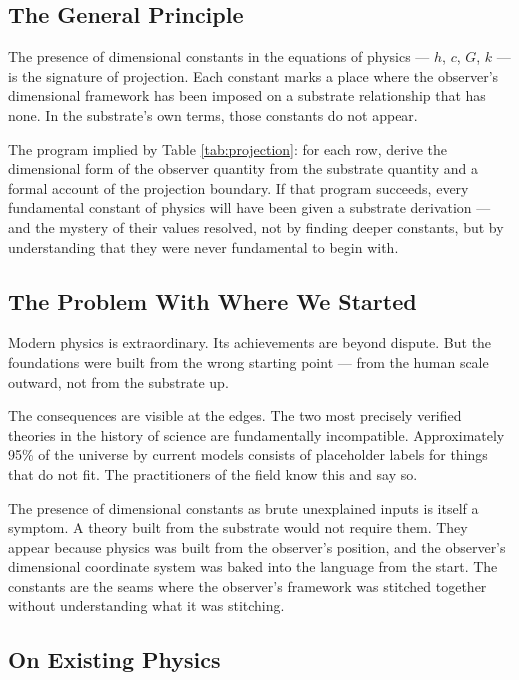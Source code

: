 \documentclass[12pt, letterpaper]{article}
\begin{document}
\subsection{The General Principle}
\label{sec:orgadde828}

The presence of dimensional constants in the equations of physics --- \(h\),
\(c\), \(G\), \(k\) --- is the signature of projection. Each constant marks a
place where the observer's dimensional framework has been imposed on a substrate
relationship that has none. In the substrate's own terms, those constants do not
appear.

The program implied by Table \ref{tab:projection}: for each row, derive the
dimensional form of the observer quantity from the substrate quantity and a
formal account of the projection boundary. If that program succeeds, every
fundamental constant of physics will have been given a substrate derivation ---
and the mystery of their values resolved, not by finding deeper constants, but
by understanding that they were never fundamental to begin with.
\subsection{The Problem With Where We Started}
\label{sec:org58bafb6}

Modern physics is extraordinary. Its achievements are beyond dispute. But the
foundations were built from the wrong starting point --- from the human scale
outward, not from the substrate up.

The consequences are visible at the edges. The two most precisely verified
theories in the history of science are fundamentally incompatible. Approximately
95\% of the universe by current models consists of placeholder labels for things
that do not fit. The practitioners of the field know this and say so.

The presence of dimensional constants as brute unexplained inputs is itself a
symptom. A theory built from the substrate would not require them. They appear
because physics was built from the observer's position, and the observer's
dimensional coordinate system was baked into the language from the start. The
constants are the seams where the observer's framework was stitched together
without understanding what it was stitching.
\subsection{On Existing Physics}
\label{sec:orgf4453b0}
\end{document}
